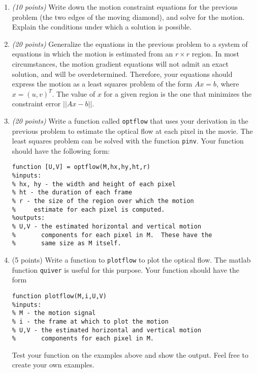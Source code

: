 \documentclass[11pt]{article}
\begin{document}
\begin{enumerate}

\item \emph{(10 points)} Write down the motion constraint equations for the previous problem (the two edges of the moving diamond), and solve for the motion.  Explain the conditions under which a solution is possible.

\item \emph{(20 points)} Generalize the equations in the previous problem to a system of equations in which the motion is estimated from an $r \times r$ region.  In most circumstances, the motion gradient equations will not admit an exact solution, and will be overdetermined.  Therefore, your equations should express the motion as a least squares problem of the form $Ax = b$, where $x = (u,v)^T$.  The value of $x$ for a given region is the one that minimizes the constraint error $||Ax - b||$.

\item \emph{(20 points)}  Write a function called \texttt{optflow} that uses your derivation in the previous problem to estimate the optical flow at each pixel in the movie.  The least squares problem can be solved with the function \texttt{pinv}.  Your function should have the following form:
\begin{verbatim}
function [U,V] = optflow(M,hx,hy,ht,r)
%inputs:
% hx, hy - the width and height of each pixel
% ht - the duration of each frame
% r - the size of the region over which the motion
%     estimate for each pixel is computed.
%outputs:
% U,V - the estimated horizontal and vertical motion
%       components for each pixel in M.  These have the
%       same size as M itself.
\end{verbatim}

\item{(5 points)} Write a function to \texttt{plotflow} to plot the optical flow.  The matlab function \texttt{quiver} is useful for this purpose.  Your function should have the form
\begin{verbatim}
function plotflow(M,i,U,V)
%inputs:
% M - the motion signal
% i - the frame at which to plot the motion
% U,V - the estimated horizontal and vertical motion
%       components for each pixel in M.
\end{verbatim}
Test your function on the examples above and show the output.  Feel free to create your own examples.

\end{enumerate}
\end{document}
